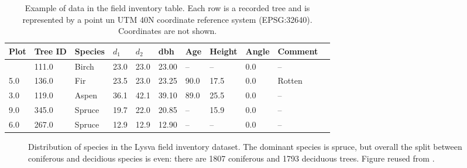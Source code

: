 \begin{longtable}[]{@{}lllllllllll@{}}

\caption[Example of data in the field inventory table.]{\label{tbl-inventory-example}Example of data in the field
inventory table. Each row is a recorded tree and is represented by a point un UTM 40N coordinate reference system (EPSG:32640). Coordinates are not shown.}

\tabularnewline

\toprule\noalign{}
Plot & Tree ID & Species & $d_1$ & $d_2$ & dbh & Age & Height & Angle &
Comment \\
\midrule\noalign{}
\endhead
\bottomrule\noalign{}
\endlastfoot
7.0 & 111.0 & Birch & 23.0 & 23.0 & 23.00 & – & – & 0.0 & – \\
5.0 & 136.0 & Fir & 23.5 & 23.0 & 23.25 & 90.0 & 17.5 & 0.0 & Rotten \\
3.0 & 119.0 & Aspen & 36.1 & 42.1 & 39.10 & 89.0 & 25.5 & 0.0 & – \\
9.0 & 345.0 & Spruce & 19.7 & 22.0 & 20.85 & – & 15.9 & 0.0 & – \\
6.0 & 267.0 & Spruce & 12.9 & 12.9 & 12.90 & – & – & 0.0 & – \\

\end{longtable}

\begin{figure}
\caption[Distribution of species in the Lysva field inventory dataset]{\label{fig-lysva-species-distribution}Distribution of species
in the Lysva field inventory dataset. The dominant species is spruce,
but overall the split between coniferous and decidious species is even:
there are 1807 coniferous and 1793 deciduous trees.
Figure reused from \citet{dubrovinOpenDatasetIndividual2024}.}
\end{figure}

